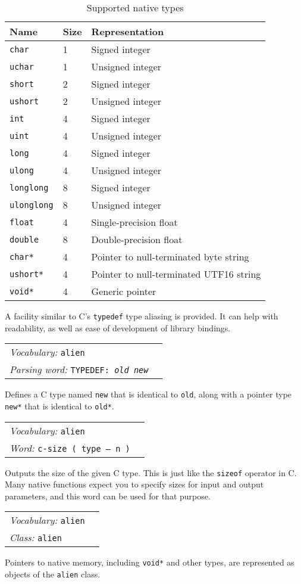 \documentclass{book}
\newcommand{\vocabulary}[1]{\emph{Vocabulary:} \texttt{#1}&\\}
\newcommand{\parsingword}[2]{\index{\texttt{#1}}\emph{Parsing word:} \texttt{#2}&\\}
\newcommand{\ordinaryword}[2]{\index{\texttt{#1}}\emph{Word:} \texttt{#2}&\\}
\newcommand{\classword}[1]{\index{\texttt{#1}}\emph{Class:} \texttt{#1}&\\}
\newcommand{\wordtable}[1]{


\begin{tabularx}{12cm}{lX}
\hline
#1
\hline
\end{tabularx}

}
\begin{document}
\begin{table}
\caption{\label{c-types}Supported native types}
\begin{tabular}{l|l|l}
Name&Size&Representation\\
\hline
\texttt{char}        &1&   Signed integer\\
\texttt{uchar}       &1&   Unsigned integer\\
\texttt{short}       &2&   Signed integer\\
\texttt{ushort}      &2&   Unsigned integer\\
\texttt{int}         &4&   Signed integer\\
\texttt{uint}        &4&   Unsigned integer\\
\texttt{long}        &4&   Signed integer\\
\texttt{ulong}       &4&   Unsigned integer\\
\texttt{longlong}    &8&   Signed integer\\
\texttt{ulonglong}   &8&   Unsigned integer\\
\texttt{float}       &4&   Single-precision float\\
\texttt{double}      &8&   Double-precision float\\
\texttt{char*}       &4&   Pointer to null-terminated byte string\\
\texttt{ushort*}     &4&   Pointer to null-terminated UTF16 string\\
\texttt{void*}       &4&   Generic pointer
\end{tabular}
\end{table}

A facility similar to C's \verb|typedef| type aliasing is provided. It can help with readability, as well as ease of development of library bindings.

\wordtable{
\vocabulary{alien}
\parsingword{TYPEDEF:}{TYPEDEF:~\emph{old} \emph{new}}
}
Defines a C type named \verb|new| that is identical to \verb|old|, along with a pointer type \verb|new*| that is identical to \verb|old*|.

\wordtable{
\vocabulary{alien}
\ordinaryword{c-size}{c-size ( type -- n )}
}
Outputs the size of the given C type. This is just like the \verb|sizeof| operator in C.
Many native functions expect you to specify sizes for input and output parameters, and
this word can be used for that purpose.

\wordtable{
\vocabulary{alien}
\classword{alien}
}
Pointers to native memory, including \verb|void*| and other types, are represented as objects of the \verb|alien| class.
\end{document}
